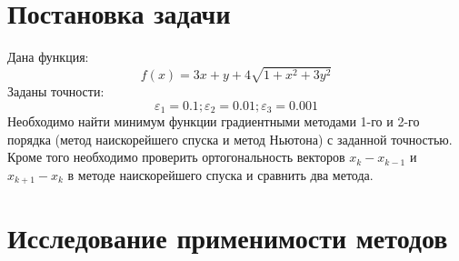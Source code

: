 
\usepackage{amsmath}




\renewcommand\contentsname{\centerline{Содержание}}
\tableofcontents
\newpage

\section{Постановка задачи}
Дана функция:
\begin{equation}
f(x) = 3x+y+4\sqrt{1+x^2+3y^2}
\end{equation}
Заданы точности:
\begin{equation}
\varepsilon_1 = 0.1; \varepsilon_2 = 0.01; \varepsilon_3 = 0.001
\end{equation}
Необходимо найти минимум функции градиентными методами 1-го и 2-го порядка (метод наискорейшего спуска и метод Ньютона) с заданной точностью.\\
Кроме того необходимо проверить ортогональность векторов $x_k-x_{k-1}$ и $x_{k+1}-x_k$ в методе наискорейшего спуска и сравнить два метода.

\section{Исследование применимости методов}
